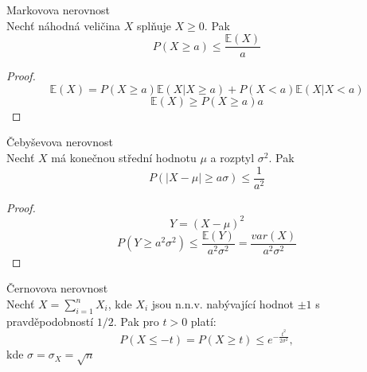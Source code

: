 \documentclass[../main.tex]{subfiles}
\begin{document}
\begin{theorem}
    Markovova nerovnost\\

    Nechť náhodná veličina $X$ splňuje $X\geq 0$. Pak
    \[P(X\geq a) \leq \frac{\mathbb{E}(X)}{a}\]
    \begin{proof}
        \[\mathbb{E}(X) = P(X\geq a)\mathbb{E}(X|X\geq a) + P(X< a) \mathbb{E}(X|X<a)\]
        \[ \mathbb{E}(X) \geq P(X\geq a)a\]
    \end{proof}
\end{theorem}
\begin{theorem}
    Čebyševova nerovnost\\

    Nechť $X$ má konečnou střední hodnotu $\mu$ a rozptyl $\sigma^2$. Pak
    \[P(|X-\mu|\geq a\sigma)\leq \frac{1}{a^2}\]
    \begin{proof}
        \[Y = (X-\mu)^2\]
        \[P(Y\geq a^2\sigma^2) \leq \frac{\mathbb{E}(Y)}{a^2\sigma^2}= \frac{var(X)}{a^2\sigma^2}\]
    \end{proof}
\end{theorem} 
\begin{theorem}
    Černovova nerovnost\\

    Nechť $X = \sum^n_{i=1} X_i$, kde $X_i$ jsou n.n.v. nabývající hodnot $\pm 1$ s pravděpodobností $1/2$. Pak pro $t>0$ platí:
    \[P(X\leq -t) = P(X\geq t) \leq e^{-\frac{t^2}{2\sigma^2}},\]
    kde $\sigma = \sigma_X = \sqrt{n}$ 
\end{theorem}
\end{document}
